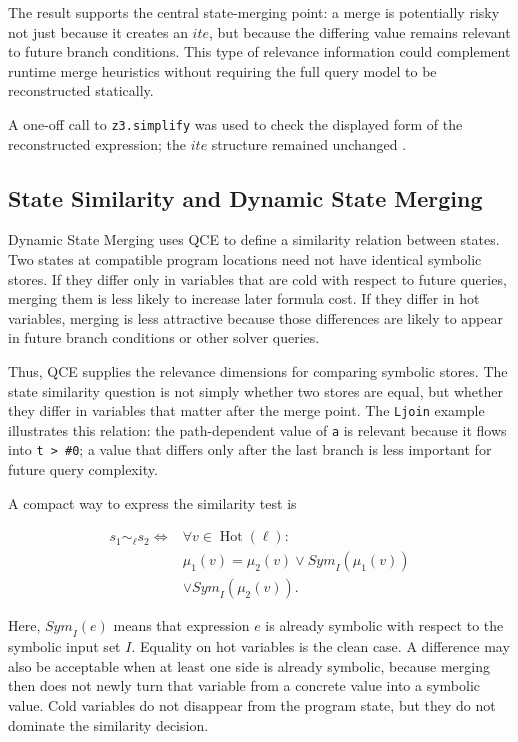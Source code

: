 \documentclass[conference]{IEEEtran}
\newcommand{\ite}{\mathit{ite}}
\begin{document}
The result supports the central state-merging point: a merge is potentially
risky not just because it creates an \(\ite\), but because the differing
value remains relevant to future branch conditions. This type of relevance
information could complement runtime merge heuristics without requiring the
full query model to be reconstructed statically.

A one-off call to \texttt{z3.simplify} was used to check the displayed form of
the reconstructed expression; the \(\ite\) structure remained unchanged
\cite{z3}.

\subsection{State Similarity and Dynamic State Merging}
\label{sec:dsm}

Dynamic State Merging uses QCE to define a similarity relation between states.
Two states at compatible program locations need not have identical symbolic
stores. If they differ only in variables that are cold with respect to future
queries, merging them is less likely to increase later formula cost. If they
differ in hot variables, merging is less attractive because those differences
are likely to appear in future branch conditions or other solver queries.

Thus, QCE supplies the relevance dimensions for comparing symbolic stores. The
state similarity question is not simply whether two stores are equal, but
whether they differ in variables that matter after the merge point. The
\texttt{Ljoin} example illustrates this relation: the path-dependent value of
\texttt{a} is relevant because it flows into \texttt{t > \#0}; a value that
differs only after the last branch is less important for future query
complexity.

A compact way to express the similarity test is

\[
\begin{aligned}
s_1 \sim_\ell s_2
\iff {} & \forall v \in \operatorname{Hot}(\ell): \\
& \mu_1(v)=\mu_2(v)
\lor \mathit{Sym}_I(\mu_1(v)) \\
& \lor \mathit{Sym}_I(\mu_2(v)).
\end{aligned}
\]

Here, \(\mathit{Sym}_I(e)\) means that expression \(e\) is already symbolic
with respect to the symbolic input set \(I\). Equality on hot variables is the
clean case. A difference may also be acceptable when at least one side is
already symbolic, because merging then does not newly turn that variable from a
concrete value into a symbolic value. Cold variables do not disappear from the
program state, but they do not dominate the similarity decision.
\end{document}
